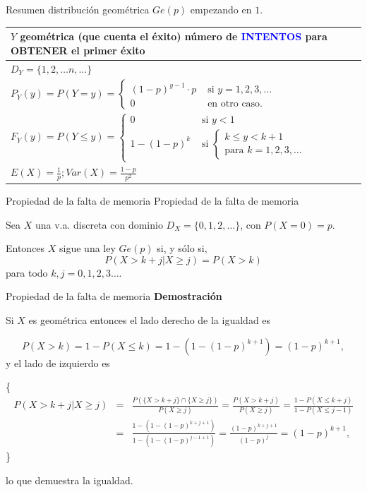 \documentclass[
  ignorenonframetext,
  aspectratio=169]{beamer}
\newcommand\blue[1]{\textcolor{blue}{#1}}
\begin{document}
\begin{frame}{Resumen distribución geométrica \(Ge(p)\) empezando en
\(1\).}
\protect\hypertarget{resumen-distribuciuxf3n-geomuxe9trica-gep-empezando-en-1.}{}
\renewcommand{\arraystretch}{1.75}
\begin{table}
\centering
\begin{tabular}{|l|}
\hline\rowcolor{LightBlue}
$Y$ geométrica (que cuenta el éxito) número de \blue{INTENTOS}  para OBTENER el primer éxito
\\\hline
$D_Y=\{1,2,\ldots n,\ldots\}$ \\\hline
$P_Y(y)=P(Y=y)=\left\{\begin{array}{ll}(1-p)^{y-1}\cdot p & \mbox{ si } y=1,2,3,\ldots\\  0  & \mbox{ en otro caso.}\end{array}\right.$\\\hline
$F_Y(y)=P(Y\leq y)=\left\{\begin{array}{ll} 0 & \mbox{ si } y<1\\ 1- (1-p)^{k} & \mbox{ si } \left\{ \begin{array}{l}k\leq y< k+1\\\mbox{para } k=1,2,3,\dots \end{array}    \right.\end{array}\right.$ \\\hline
$E(X)=\frac1{p}; Var(X)=\frac{1-p}{p^2}$
\\\hline
\end{tabular}
\end{table}
\end{frame}

\begin{frame}{Propiedad de la falta de memoria}
\protect\hypertarget{propiedad-de-la-falta-de-memoria}{}
Propiedad de la falta de memoria

Sea \(X\) una v.a. discreta con dominio \(D_X=\{0,1,2,\ldots\}\), con
\(P(X=0)=p\).

Entonces \(X\) sigue una ley \(Ge(p)\) si, y sólo si, \[
P\left(X> k+j\big| X\geq j\right)=P(X> k)
\] para todo \(k,j=0,1,2,3\ldots\).
\end{frame}

\begin{frame}{Propiedad de la falta de memoria}
\protect\hypertarget{propiedad-de-la-falta-de-memoria-1}{}
\textbf{Demostración}

Si \(X\) es geométrica entonces el lado derecho de la igualdad es

\[
P(X>k)=1-P(X\leq k)=1-\left(1-(1-p)^{k+1}\right)=(1-p)^{k+1},
\] y el lado de izquierdo es

\scriptsize\{ \begin{eqnarray*}
P\left(X> k+j\big| X\geq j\right)&=&\frac{P\left(\{X> k+j\}\cap \{X\geq j\} \right)}{P\left(X\geq j\right)}=
\frac{P\left(X>k+j \right)}{P\left(X\geq j \right)} = \frac{1-P(X\leq k+j)}{1-P(X\leq j-1)}\\
&=&  \frac{1-(1-(1-p)^{k+j+1})}{1-(1-(1-p)^{j-1+1})} =\frac{(1-p)^{k+j+1}}{(1-p)^{j}} = (1-p)^{k+1},
\end{eqnarray*} \} \normalsize

lo que demuestra la igualdad.
\end{frame}
\end{document}

